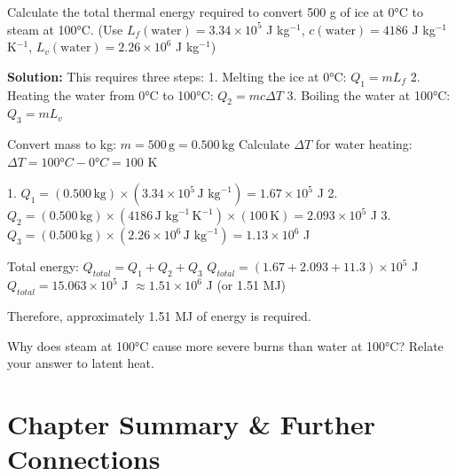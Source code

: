 \begin{example}
Calculate the total thermal energy required to convert 500 g of ice at 0°C to steam at 100°C.
(Use \(L_f(\text{water}) = 3.34 \times 10^5\) J kg\(^{-1}\), \(c(\text{water}) = 4186\) J kg\(^{-1}\) K\(^{-1}\), \(L_v(\text{water}) = 2.26 \times 10^6\) J kg\(^{-1}\))

\textbf{Solution:}
This requires three steps:
1.  Melting the ice at 0°C: \(Q_1 = mL_f\)
2.  Heating the water from 0°C to 100°C: \(Q_2 = mc\Delta T\)
3.  Boiling the water at 100°C: \(Q_3 = mL_v\)

Convert mass to kg: \(m = 500\,\text{g} = 0.500\,\text{kg}\)
Calculate \(\Delta T\) for water heating: \(\Delta T = 100°C - 0°C = 100\) K

1.  \(Q_1 = (0.500\,\text{kg}) \times (3.34 \times 10^5\,\text{J kg}^{-1}) = 1.67 \times 10^5\) J
2.  \(Q_2 = (0.500\,\text{kg}) \times (4186\,\text{J kg}^{-1}\,\text{K}^{-1}) \times (100\,\text{K}) = 2.093 \times 10^5\) J
3.  \(Q_3 = (0.500\,\text{kg}) \times (2.26 \times 10^6\,\text{J kg}^{-1}) = 1.13 \times 10^6\) J

Total energy: \(Q_{total} = Q_1 + Q_2 + Q_3\)
\(Q_{total} = (1.67 + 2.093 + 11.3) \times 10^5\) J
\(Q_{total} = 15.063 \times 10^5\) J \(\approx 1.51 \times 10^6\) J (or 1.51 MJ)

Therefore, approximately 1.51 MJ of energy is required.
\end{example}

\begin{stopandthink}
Why does steam at 100°C cause more severe burns than water at 100°C? Relate your answer to latent heat.
\end{stopandthink}


\FloatBarrier

\section{Chapter Summary & Further Connections}
\label{sec:thermo_summary}
\FloatBarrier

